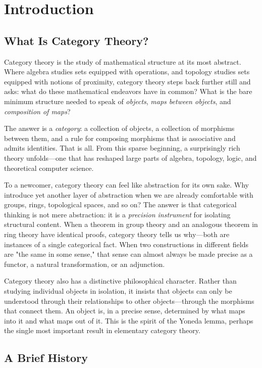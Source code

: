 \chapter{Introduction}

\section{What Is Category Theory?}

Category theory is the study of mathematical structure at its most abstract. Where algebra studies sets equipped with operations, and topology studies sets equipped with notions of proximity, category theory steps back further still and asks: what do these mathematical endeavors have in common? What is the bare minimum structure needed to speak of \emph{objects}, \emph{maps between objects}, and \emph{composition of maps}?

The answer is a \emph{category}: a collection of objects, a collection of morphisms between them, and a rule for composing morphisms that is associative and admits identities. That is all. From this sparse beginning, a surprisingly rich theory unfolds—one that has reshaped large parts of algebra, topology, logic, and theoretical computer science.

To a newcomer, category theory can feel like abstraction for its own sake. Why introduce yet another layer of abstraction when we are already comfortable with groups, rings, topological spaces, and so on? The answer is that categorical thinking is not mere abstraction: it is a \emph{precision instrument} for isolating structural content. When a theorem in group theory and an analogous theorem in ring theory have identical proofs, category theory tells us why—both are instances of a single categorical fact. When two constructions in different fields are "the same in some sense," that sense can almost always be made precise as a functor, a natural transformation, or an adjunction.

Category theory also has a distinctive philosophical character. Rather than studying individual objects in isolation, it insists that objects can only be understood through their relationships to other objects—through the morphisms that connect them. An object is, in a precise sense, determined by what maps into it and what maps out of it. This is the spirit of the Yoneda lemma, perhaps the single most important result in elementary category theory.

\section{A Brief History}

